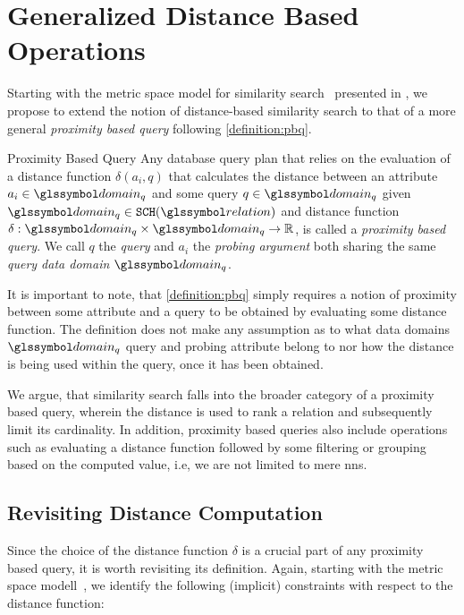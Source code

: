 \section{Generalized Distance Based Operations}

Starting with the metric space model for similarity search~\cite{Zezula:2006similarity} presented in , we propose to extend the notion of distance-based similarity search to that of a more general \emph{proximity based query} following \cref{definition:pbq}.

\begin{definition}[label=definition:pbq]{Proximity Based Query}{}
    Any database query plan that relies on the evaluation of a distance function $\delta(a_{i}, q)$ that calculates the distance between an attribute $a_{i} \in \domain_q$ and some query $q \in \domain_q$ given $\domain_q \in \mathtt{SCH}(\relation)$ and distance function $\delta: \domain_q \times \domain_q \rightarrow \mathbb{R}$, is called a \emph{proximity based query}. We call $q$ the \emph{query} and $a_i$ the \emph{probing argument} both sharing the same \emph{query data domain} $\domain_q$.
\end{definition}

It is important to note, that \cref{definition:pbq} simply requires a notion of proximity between some attribute and a query to be obtained by evaluating some distance function. The definition does not make any assumption as to what data domains $\domain_q$ query and probing attribute belong to nor how the distance is being used within the query, once it has been obtained. 

We argue, that similarity search falls into the broader category of a proximity based query, wherein the distance is used to rank a relation and subsequently limit its cardinality. In addition, proximity based queries also include operations such as evaluating a distance function followed by some filtering or grouping based on the computed value, i.e, we are not limited to mere \acrshort{nns}.

\subsection{Revisiting Distance Computation}

Since the choice of the distance function $\delta$ is a crucial part of any proximity based query, it is worth revisiting its definition. Again, starting with the metric space modell~\cite{Zezula:2006similarity}, we identify the following (implicit) constraints with respect to the distance function:

